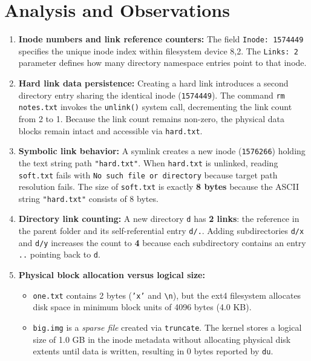 \documentclass[12pt,a4paper]{report}
\numberwithin{equation}{chapter}
\numberwithin{figure}{chapter}
\numberwithin{table}{chapter}
\begin{document}
\section{Analysis and Observations}
\begin{enumerate}
    \item \textbf{Inode numbers and link reference counters:} The field \texttt{Inode: 1574449} specifies the unique inode index within filesystem device 8,2. The \texttt{Links: 2} parameter defines how many directory namespace entries point to that inode.
    \item \textbf{Hard link data persistence:} Creating a hard link introduces a second directory entry sharing the identical inode (\texttt{1574449}). The command \texttt{rm notes.txt} invokes the \texttt{unlink()} system call, decrementing the link count from 2 to 1. Because the link count remains non-zero, the physical data blocks remain intact and accessible via \texttt{hard.txt}.
    \item \textbf{Symbolic link behavior:} A symlink creates a new inode (\texttt{1576266}) holding the text string path \texttt{"hard.txt"}. When \texttt{hard.txt} is unlinked, reading \texttt{soft.txt} fails with \texttt{No such file or directory} because target path resolution fails. The size of \texttt{soft.txt} is exactly \textbf{8 bytes} because the ASCII string \texttt{"hard.txt"} consists of 8 bytes.
    \item \textbf{Directory link counting:} A new directory \texttt{d} has \textbf{2 links}: the reference in the parent folder and its self-referential entry \texttt{d/.}. Adding subdirectories \texttt{d/x} and \texttt{d/y} increases the count to \textbf{4} because each subdirectory contains an entry \texttt{..} pointing back to \texttt{d}.
    \item \textbf{Physical block allocation versus logical size:}
    \begin{itemize}
        \item \texttt{one.txt} contains 2 bytes (\texttt{'x'} and \texttt{\textbackslash n}), but the ext4 filesystem allocates disk space in minimum block units of 4096 bytes (4.0 KB).
        \item \texttt{big.img} is a \textit{sparse file} created via \texttt{truncate}. The kernel stores a logical size of 1.0 GB in the inode metadata without allocating physical disk extents until data is written, resulting in 0 bytes reported by \texttt{du}.
    \end{itemize}
\end{enumerate}
\end{document}
